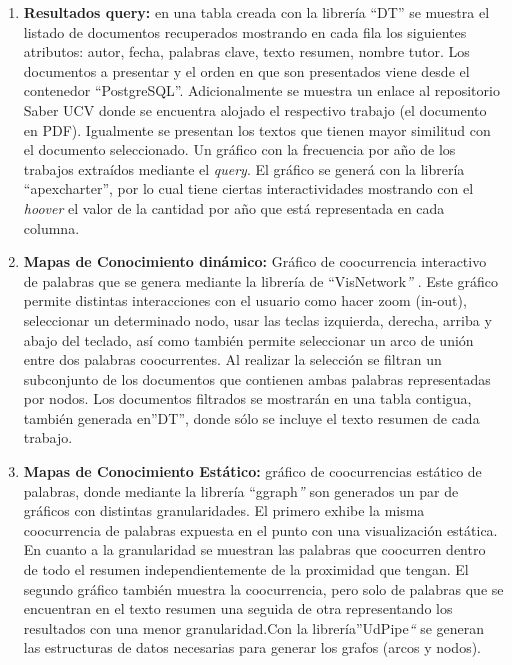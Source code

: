 \documentclass[
  12pt,
  openany]{book}
\begin{document}
\begin{enumerate}
\begin{enumerate}
    \begin{enumerate}
    \def\labelenumiii{\arabic{enumiii}.}
    \item
      \textbf{Resultados query:} en una tabla creada con la librería ``DT'' se muestra el listado de documentos recuperados mostrando en cada fila los siguientes atributos: autor, fecha, palabras clave, texto resumen, nombre tutor. Los documentos a presentar y el orden en que son presentados viene desde el contenedor ``PostgreSQL''. Adicionalmente se muestra un enlace al repositorio Saber UCV donde se encuentra alojado el respectivo trabajo (el documento en PDF). Igualmente se presentan los textos que tienen mayor similitud con el documento seleccionado. Un gráfico con la frecuencia por año de los trabajos extraídos mediante el \emph{query}. El gráfico se generá con la librería ``apexcharter'', por lo cual tiene ciertas interactividades mostrando con el \emph{hoover} el valor de la cantidad por año que está representada en cada columna.
    \item
      \textbf{Mapas de Conocimiento dinámico:} Gráfico de coocurrencia interactivo de palabras que se genera mediante la librería de ``VisNetwork\emph{''} . Este gráfico permite distintas interacciones con el usuario como hacer zoom (in-out), seleccionar un determinado nodo, usar las teclas izquierda, derecha, arriba y abajo del teclado, así como también permite seleccionar un arco de unión entre dos palabras coocurrentes. Al realizar la selección se filtran un subconjunto de los documentos que contienen ambas palabras representadas por nodos. Los documentos filtrados se mostrarán en una tabla contigua, también generada en''DT'', donde sólo se incluye el texto resumen de cada trabajo.
    \item
      \textbf{Mapas de Conocimiento Estático:} gráfico de coocurrencias estático de palabras, donde mediante la librería ``ggraph\emph{''} son generados un par de gráficos con distintas granularidades. El primero exhibe la misma coocurrencia de palabras expuesta en el punto con una visualización estática. En cuanto a la granularidad se muestran las palabras que coocurren dentro de todo el resumen independientemente de la proximidad que tengan. El segundo gráfico también muestra la coocurrencia, pero solo de palabras que se encuentran en el texto resumen una seguida de otra representando los resultados con una menor granularidad.Con la librería''UdPipe\emph{``} se generan las estructuras de datos necesarias para generar los grafos (arcos y nodos).
    \end{enumerate}


\end{enumerate}
\end{enumerate}
\end{document}
